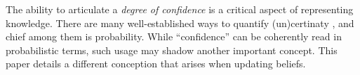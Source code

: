 \def\stmt{$A$}

The ability to articulate a \emph{degree of confidence} 
is a critical aspect of representing knowledge.
There are 
many well-established ways to quantify (un)certinaty \parencite[\S2]{halpern2017reasoning},
	and chief among them is probability.
While ``confidence'' can be coherently read in probabilistic terms,
	such usage may shadow another important concept.
This paper details a different conception that arises when updating beliefs. 
